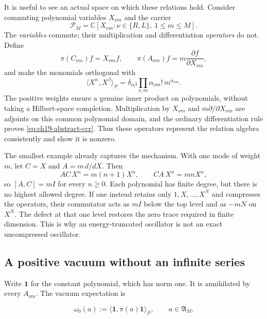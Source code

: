 It is useful to see an actual space on which these relations hold.
Consider commuting polynomial variables $X_{\nu m}$ and the carrier
\[
 \mathcal P_M=\mathbb C[X_{\nu m}:\nu\in\{R,L\},\ 1\leq m\leq M].
\]
The \emph{variables} commute; their multiplication and differentiation
\emph{operators} do not.  Define
\begin{equation}
 \pi(C_{\nu m})f=X_{\nu m}f,
 \qquad \pi(A_{\nu m})f=m\frac{\partial f}{\partial X_{\nu m}},
 \label{eq:ch19-polynomial-representation}
\end{equation}
and make the monomials orthogonal with
\begin{equation}
 \langle X^{\alpha},X^{\beta}\rangle_{\mathcal P}
  =\delta_{\alpha\beta}
   \prod_{\nu,m}\alpha_{\nu m}!\,m^{\alpha_{\nu m}}.
 \label{eq:ch19-polynomial-gram}
\end{equation}
The positive weights ensure a genuine inner product on polynomials,
without taking a Hilbert-space completion.  Multiplication by
$X_{\nu m}$ and $m\partial/\partial X_{\nu m}$ are adjoints on this
common polynomial domain, and the ordinary differentiation rule proves
\eqref{eq:ch19-abstract-ccr}.  Thus these operators represent the
relation algebra consistently and show it is nonzero.

The smallest example already captures the mechanism.  With one mode of
weight $m$, let $C=X$ and $A=m\,d/dX$.  Then
\begin{equation}
 AC\,X^n=m(n+1)X^n,
 \qquad CA\,X^n=mnX^n,
 \label{eq:ch19-one-mode-ccr}
\end{equation}
so $[A,C]=mI$ for every $n\geq0$.  Each polynomial has finite
degree, but there is no highest allowed degree.  If one instead
retains only $1,X,\ldots,X^N$ and compresses the operators, their
commutator acts as $mI$ below the top level and as $-mN$ on $X^N$.
The defect at that one level restores the zero trace required in
finite dimension.  This is why an energy-truncated oscillator is not
an exact uncompressed oscillator.

\subsection*{A positive vacuum without an infinite series}

Write $\mathbf1$ for the constant polynomial, which has norm one.
It is annihilated by every $A_{\nu m}$.  The vacuum expectation is
\begin{definition}
\label{def:ch19-polynomial-vacuum}
\begin{equation}
 \omega_0(a):=\langle\mathbf1,\pi(a)\mathbf1\rangle_{\mathcal P},
 \qquad a\in\mathfrak A_M.
 \label{eq:ch19-omega-zero}
\end{equation}
\end{definition}

